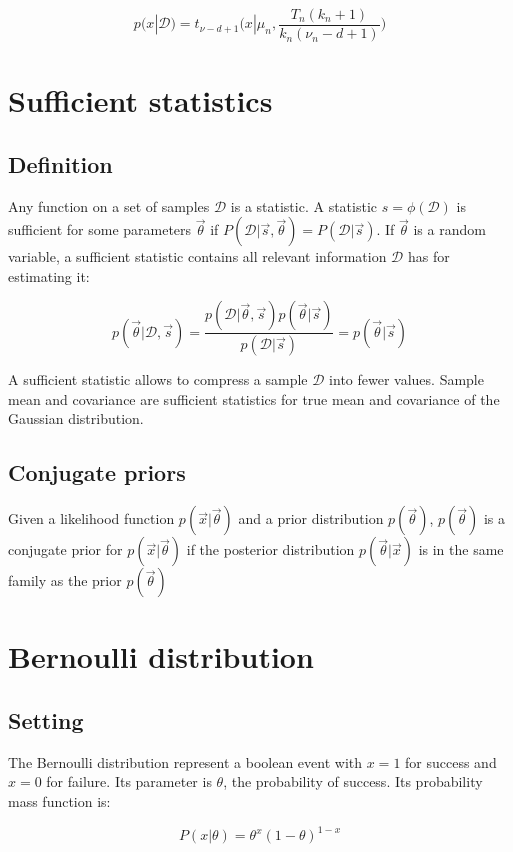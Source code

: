 		$$p(x|\mathcal{D}) = t_{\nu-d+1}\biggl(x|\mu_n, \frac{T_n(k_n+1)}{k_n(\nu_n-d+1)}\biggr)$$

\section{Sufficient statistics}

	\subsection{Definition}
	Any function on a set of samples $\mathcal{D}$ is a statistic.
	A statistic $s = \phi(\mathcal{D})$ is sufficient for some parameters $\vec{\theta}$ if $P(\mathcal{D}|\vec{s}, \vec{\theta}) = P(\mathcal{D}|\vec{s})$.
	If $\vec{\theta}$ is a random variable, a sufficient statistic contains all relevant information $\mathcal{D}$ has for estimating it:

	$$p(\vec{\theta}|\mathcal{D}, \vec{s}) = \frac{p(\mathcal{D}|\vec{\theta}, \vec{s})p(\vec{\theta}|\vec{s})}{p(\mathcal{D}|\vec{s})} = p(\vec{\theta}|\vec{s})$$

	A sufficient statistic allows to compress a sample $\mathcal{D}$ into fewer values.
	Sample mean and covariance are sufficient statistics for true mean and covariance of the Gaussian distribution.

	\subsection{Conjugate priors}
	Given a likelihood function $p(\vec{x}|\vec{\theta})$ and a prior distribution $p(\vec{\theta})$, $p(\vec{\theta})$ is a conjugate prior for $p(\vec{x}|\vec{\theta})$ if the posterior distribution $p(\vec{\theta}|\vec{x})$ is in the same family as the prior $p(\vec{\theta})$

\section{Bernoulli distribution}

	\subsection{Setting}
	The Bernoulli distribution represent a boolean event with $x=1$ for success and $x=0$ for failure.
	Its parameter is $\theta$, the probability of success.
	Its probability mass function is:

	$$P(x|\theta) = \theta^x(1-\theta)^{1-x}$$

